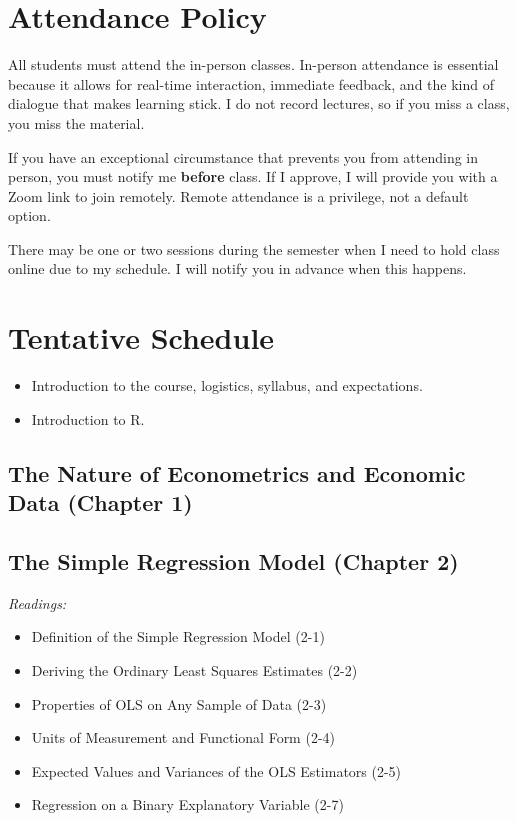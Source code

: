 \documentclass[11pt,letterpaper]{article}
\begin{document}
\section*{Attendance Policy}

All students must attend the in-person classes. In-person attendance is essential because it allows for real-time interaction, immediate feedback, and the kind of dialogue that makes learning stick. I do not record lectures, so if you miss a class, you miss the material.

If you have an exceptional circumstance that prevents you from attending in person, you must notify me \textbf{before} class. If I approve, I will provide you with a Zoom link to join remotely. Remote attendance is a privilege, not a default option.

There may be one or two sessions during the semester when I need to hold class online due to my schedule. I will notify you in advance when this happens.

\section*{Tentative Schedule}

\begin{itemize}
    \item Introduction to the course, logistics, syllabus, and expectations.
    \item Introduction to R.
\end{itemize}

\subsection*{The Nature of Econometrics and Economic Data (Chapter 1)}

\subsection*{The Simple Regression Model (Chapter 2)}
\textit{Readings:}
\begin{itemize}
    \item Definition of the Simple Regression Model (2-1)
    \item Deriving the Ordinary Least Squares Estimates (2-2)
    \item Properties of OLS on Any Sample of Data (2-3)
    \item Units of Measurement and Functional Form (2-4)
    \item Expected Values and Variances of the OLS Estimators (2-5)
    \item Regression on a Binary Explanatory Variable (2-7)
\end{itemize}
\end{document}
